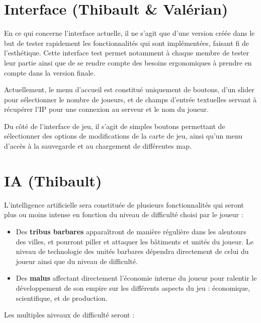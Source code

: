 \documentclass[12pt]{report}
\begin{document}
\section{Interface (Thibault \& Valérian)}

En ce qui concerne l’interface actuelle, il ne s’agit que d’une version créée dans le but de tester rapidement les fonctionnalités qui sont implémentées, faisant fi de l’esthétique. Cette interface test permet notamment à chaque membre de tester leur partie ainsi que de se rendre compte des besoins ergonomiques à prendre en compte dans la version finale.

Actuellement, le menu d’accueil est constitué uniquement de boutons, d’un slider pour sélectionner le nombre de joueurs, et de champs d’entrée textuelles servant à récupérer l’IP pour une connexion au serveur et le nom du joueur.

Du côté de l’interface de jeu, il s’agit de simples boutons permettant de sélectionner des options de modifications de la carte de jeu, ainsi qu’un menu d'accès à la sauvegarde et au chargement de différentes map.

\section{IA (Thibault)}

L’intelligence artificielle sera constituée de plusieurs fonctionnalités qui seront plus ou moins intense en fonction du niveau de difficulté choisi par le joueur :

\begin{itemize}[label=\textbullet]
	\item Des \textbf{tribus barbares} apparaîtront de manière régulière dans les alentours des villes, et pourront piller et attaquer les bâtiments et unités du joueur. Le niveau de technologie des unités barbares dépendra directement de celui du joueur ainsi que du niveau de difficulté.
	\item Des \textbf{malus} affectant directement l’économie interne du joueur pour ralentir le développement de son empire sur les différents aspects du jeu : économique, scientifique, et de production.
\end{itemize}

Les multiples niveaux de difficulté seront :
\end{document}
